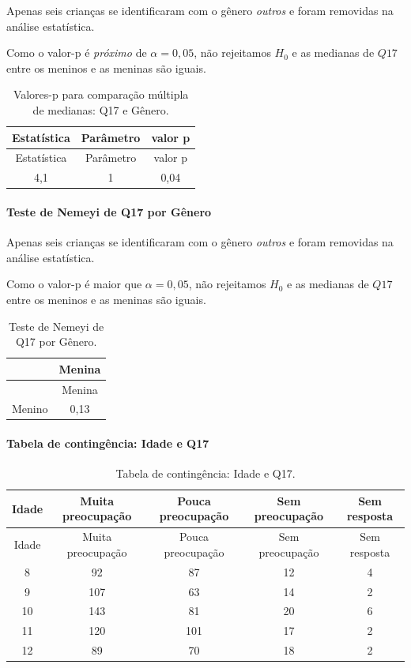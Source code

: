 \documentclass[]{article}
\let\oldparagraph\paragraph
\renewcommand{\paragraph}[1]{\oldparagraph{#1}\mbox{}}
\begin{document}
Apenas seis crianças se identificaram com o gênero \emph{outros} e foram removidas na análise estatística.

Como o valor-p é \emph{próximo} de \(\alpha=0,05\), não rejeitamos \(H_0\) e as medianas de \(Q17\) entre os meninos e as meninas são iguais.

\begin{longtable}[]{@{}ccc@{}}
\caption{\label{tab:unnamed-chunk-193}Valores-p para comparação múltipla de medianas: Q17 e Gênero.}\tabularnewline
\toprule
Estatística & Parâmetro & valor p\tabularnewline
\midrule
\endfirsthead
\toprule
Estatística & Parâmetro & valor p\tabularnewline
\midrule
\endhead
4,1 & 1 & 0,04\tabularnewline
\bottomrule
\end{longtable}

\hypertarget{teste-de-nemeyi-de-q17-por-guxeanero}{%
\paragraph{Teste de Nemeyi de Q17 por Gênero}\label{teste-de-nemeyi-de-q17-por-guxeanero}}

Apenas seis crianças se identificaram com o gênero \emph{outros} e foram removidas na análise estatística.

Como o valor-p é maior que \(\alpha=0,05\), não rejeitamos \(H_0\) e as medianas de \(Q17\) entre os meninos e as meninas são iguais.

\begin{longtable}[]{@{}lc@{}}
\caption{\label{tab:unnamed-chunk-194}Teste de Nemeyi de Q17 por Gênero.}\tabularnewline
\toprule
& Menina\tabularnewline
\midrule
\endfirsthead
\toprule
& Menina\tabularnewline
\midrule
\endhead
Menino & 0,13\tabularnewline
\bottomrule
\end{longtable}

\cleardoublepage

\hypertarget{tabela-de-continguxeancia-idade-e-q17}{%
\paragraph{Tabela de contingência: Idade e Q17}\label{tabela-de-continguxeancia-idade-e-q17}}

\begin{longtable}[]{@{}ccccc@{}}
\caption{\label{tab:unnamed-chunk-195}Tabela de contingência: Idade e Q17.}\tabularnewline
\toprule
Idade & Muita preocupação & Pouca preocupação & Sem preocupação & Sem resposta\tabularnewline
\midrule
\endfirsthead
\toprule
Idade & Muita preocupação & Pouca preocupação & Sem preocupação & Sem resposta\tabularnewline
\midrule
\endhead
8 & 92 & 87 & 12 & 4\tabularnewline
9 & 107 & 63 & 14 & 2\tabularnewline
10 & 143 & 81 & 20 & 6\tabularnewline
11 & 120 & 101 & 17 & 2\tabularnewline
12 & 89 & 70 & 18 & 2\tabularnewline
\bottomrule
\end{longtable}
\end{document}
